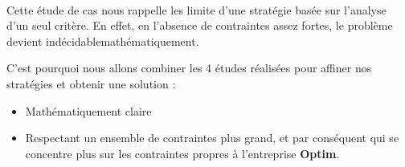 \begin{center}
\end{center}
~\\
Cette étude de cas nous rappelle les limite d'une stratégie basée sur l'analyse d'un seul critère. En effet, 
en l'absence de contraintes assez fortes, le problème devient \og indécidable\fg mathématiquement.

C'est pourquoi nous allons combiner les 4 études réalisées pour affiner nos stratégies et obtenir une solution : 
\begin{itemize}
	\item Mathématiquement claire
	\item Respectant un ensemble de contraintes plus grand, et par conséquent qui se concentre plus sur les
	contraintes propres à l'entreprise \textbf{Optim}.
\end{itemize}
